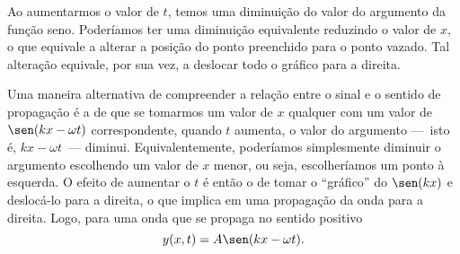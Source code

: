 \begin{marginfigure}[2cm]
\centering
{}
\caption{Ao aumentarmos o valor de $t$, temos uma diminuição do valor do argumento da função seno. Poderíamos ter uma diminuição equivalente reduzindo o valor de $x$, o que equivale a alterar a posição do ponto preenchido para o ponto vazado. Tal alteração equivale, por sua vez, a deslocar todo o gráfico para a direita.}
\end{marginfigure}

Uma maneira alternativa de compreender a relação entre o sinal e o sentido de propagação é a de que se tomarmos um valor de $x$ qualquer com um valor de $\sen(kx-\omega t)$ correspondente, quando $t$ aumenta, o valor do argumento ---~isto é, $kx -\omega t$~--- diminui. Equivalentemente, poderíamos simplesmente diminuir o argumento escolhendo um valor de $x$ menor, ou seja, escolheríamos um ponto à esquerda. O efeito de aumentar o $t$ é então o de tomar o ``gráfico'' do $\sen(kx)$ e deslocá-lo para a direita, o que implica em uma propagação da onda para a direita. Logo, para uma onda que se propaga no sentido positivo
\begin{equation}
    y(x,t) = A\sen(kx -\omega t).
\end{equation}

